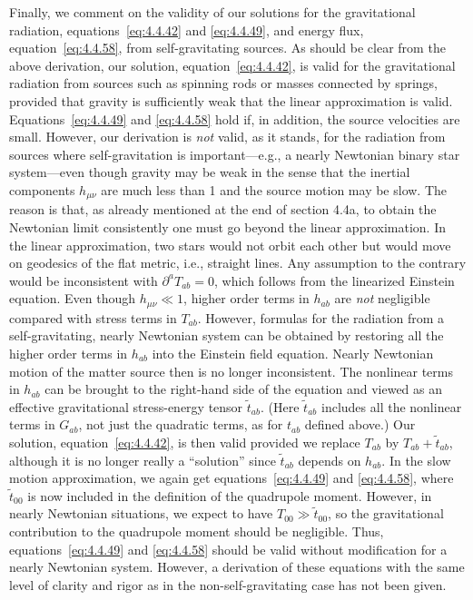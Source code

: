 Finally, we comment on the validity of our solutions for the gravitational radiation,
equations~\eqref{eq:4.4.42} and \eqref{eq:4.4.49}, and energy flux,
equation~\eqref{eq:4.4.58}, from self-gravitating sources. As should be clear from
the above derivation, our solution, equation~\eqref{eq:4.4.42}, is valid for the
gravitational radiation from sources such as spinning rods or masses connected by
springs, provided that gravity is sufficiently weak that the linear approximation is
valid. Equations~\eqref{eq:4.4.49} and \eqref{eq:4.4.58} hold if, in addition, the
source velocities are small. However, our derivation is \emph{not} valid, as it
stands, for the radiation from sources where self-gravitation is important---e.g., a
nearly Newtonian binary star system---even though gravity may be weak in the sense
that the inertial components \(h_{\mu\nu}\) are much less than 1 and the source
motion may be slow. The reason is that, as already mentioned at the end of
section 4.4a, to obtain the Newtonian limit consistently one must go beyond the
linear approximation. In the linear approximation, two stars would not orbit each
other but would move on geodesics of the flat metric, i.e., straight lines. Any
assumption to the contrary would be inconsistent with \(\partial^aT_{ab}=0\), which
follows from the linearized Einstein equation. Even though \(h_{\mu\nu}\ll1\),
higher order terms in \(h_{ab}\) are \emph{not} negligible compared with stress
terms in \(T_{ab}\). However, formulas for the radiation from a self-gravitating,
nearly Newtonian system can be obtained by restoring all the higher order terms in
\(h_{ab}\) into the Einstein field equation. Nearly Newtonian motion of the matter
source then is no longer inconsistent. The nonlinear terms in \(h_{ab}\) can be
brought to the right-hand side of the equation and viewed as an effective
gravitational stress-energy tensor \(\tilde t_{ab}\). (Here \(\tilde t_{ab}\) includes
all the nonlinear terms in \(G_{ab}\), not just the quadratic terms, as for \(t_{ab}\)
defined above.) Our solution, equation~\eqref{eq:4.4.42}, is then valid provided we
replace \(T_{ab}\) by \(T_{ab}+\tilde t_{ab}\), although it is no longer really a
``solution'' since \(\tilde t_{ab}\) depends on \(h_{ab}\). In the slow motion
approximation, we again get equations~\eqref{eq:4.4.49} and \eqref{eq:4.4.58},
where \(\tilde t_{00}\) is now included in the definition of the quadrupole moment.
However, in nearly Newtonian situations, we expect to have
\(T_{00}\gg\tilde t_{00}\),
so the gravitational contribution to the quadrupole moment should be negligible.
Thus, equations~\eqref{eq:4.4.49} and \eqref{eq:4.4.58} should be valid without
modification for a nearly Newtonian system. However, a derivation of these equations
with the same level of clarity and rigor as in the non-self-gravitating case has not
been given.

